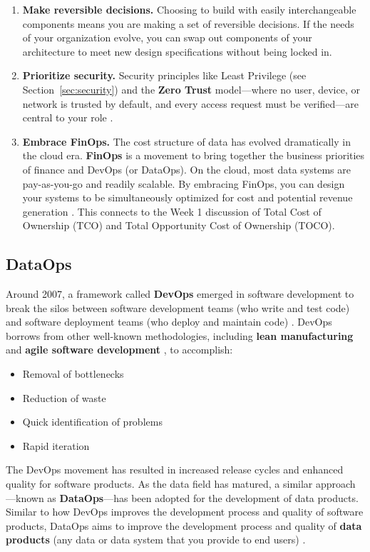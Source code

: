 \documentclass{article}
\begin{document}
\begin{enumerate}
    \item \textbf{Make reversible decisions.} Choosing to build with easily interchangeable components means you are making a set of reversible decisions. If the needs of your organization evolve, you can swap out components of your architecture to meet new design specifications without being locked in.

    \item \textbf{Prioritize security.} Security principles like Least Privilege (see Section~\ref{sec:security}) and the \textbf{Zero Trust} model---where no user, device, or network is trusted by default, and every access request must be verified---are central to your role \cite{rose2020zero}.

    \item \textbf{Embrace FinOps.} The cost structure of data has evolved dramatically in the cloud era. \textbf{FinOps} is a movement to bring together the business priorities of finance and DevOps (or DataOps). On the cloud, most data systems are pay-as-you-go and readily scalable. By embracing FinOps, you can design your systems to be simultaneously optimized for cost and potential revenue generation \cite{storment2023finops}. This connects to the Week 1 discussion of Total Cost of Ownership (TCO) and Total Opportunity Cost of Ownership (TOCO).
\end{enumerate}

\subsection{DataOps}
\label{sec:dataops}
Around 2007, a framework called \textbf{DevOps} emerged in software development to break the silos between software development teams (who write and test code) and software deployment teams (who deploy and maintain code) \cite{kim2016devops}. DevOps borrows from other well-known methodologies, including \textbf{lean manufacturing} \cite{womack2003lean} and \textbf{agile software development} \cite{beck2001agile}, to accomplish:
\begin{itemize}
    \item Removal of bottlenecks
    \item Reduction of waste
    \item Quick identification of problems
    \item Rapid iteration
\end{itemize}

The DevOps movement has resulted in increased release cycles and enhanced quality for software products. As the data field has matured, a similar approach---known as \textbf{DataOps}---has been adopted for the development of data products. Similar to how DevOps improves the development process and quality of software products, DataOps aims to improve the development process and quality of \textbf{data products} (any data or data system that you provide to end users) \cite{reis2022fundamentals, erhard2020dataops}.
\end{document}
